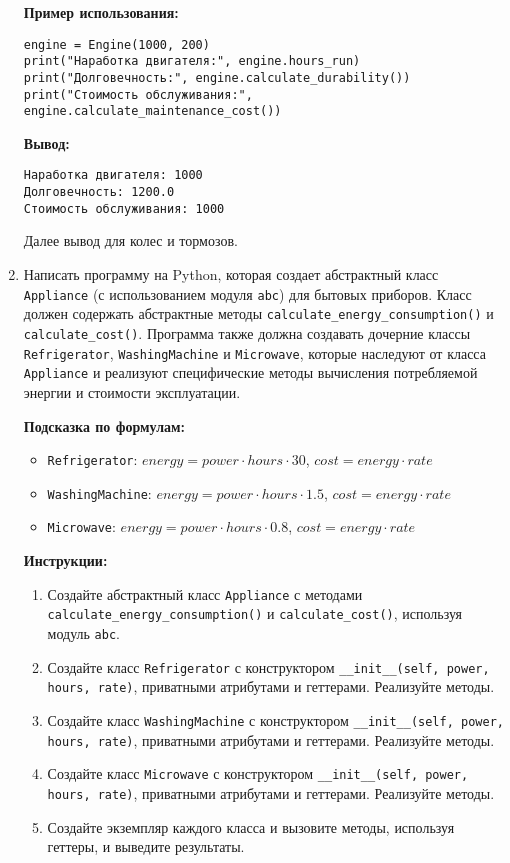 \begin{enumerate}
\textbf{Пример использования:}
\begin{verbatim}
engine = Engine(1000, 200)
print("Наработка двигателя:", engine.hours_run)
print("Долговечность:", engine.calculate_durability())
print("Стоимость обслуживания:", engine.calculate_maintenance_cost())
\end{verbatim}

\textbf{Вывод:}
\begin{verbatim}
Наработка двигателя: 1000
Долговечность: 1200.0
Стоимость обслуживания: 1000
\end{verbatim}

Далее вывод для колес и тормозов.

\item
Написать программу на Python, которая создает абстрактный класс \texttt{Appliance} (с использованием модуля \texttt{abc}) для бытовых приборов. 
Класс должен содержать абстрактные методы \texttt{calculate\_energy\_consumption()} и \texttt{calculate\_cost()}. 
Программа также должна создавать дочерние классы \texttt{Refrigerator}, \texttt{WashingMachine} и \texttt{Microwave}, 
которые наследуют от класса \texttt{Appliance} и реализуют специфические методы вычисления потребляемой энергии и стоимости эксплуатации.

\textbf{Подсказка по формулам:}
\begin{itemize}
    \item \texttt{Refrigerator}: $energy = power \cdot hours \cdot 30$, $cost = energy \cdot rate$
    \item \texttt{WashingMachine}: $energy = power \cdot hours \cdot 1.5$, $cost = energy \cdot rate$
    \item \texttt{Microwave}: $energy = power \cdot hours \cdot 0.8$, $cost = energy \cdot rate$
\end{itemize}

\textbf{Инструкции:}
\begin{enumerate}
    \item Создайте абстрактный класс \texttt{Appliance} с методами \texttt{calculate\_energy\_consumption()} и \texttt{calculate\_cost()}, используя модуль \texttt{abc}.
    \item Создайте класс \texttt{Refrigerator} с конструктором \texttt{\_\_init\_\_(self, power, hours, rate)}, приватными атрибутами и геттерами. Реализуйте методы.
    \item Создайте класс \texttt{WashingMachine} с конструктором \texttt{\_\_init\_\_(self, power, hours, rate)}, приватными атрибутами и геттерами. Реализуйте методы.
    \item Создайте класс \texttt{Microwave} с конструктором \texttt{\_\_init\_\_(self, power, hours, rate)}, приватными атрибутами и геттерами. Реализуйте методы.
    \item Создайте экземпляр каждого класса и вызовите методы, используя геттеры, и выведите результаты.
\end{enumerate}


\end{enumerate}
